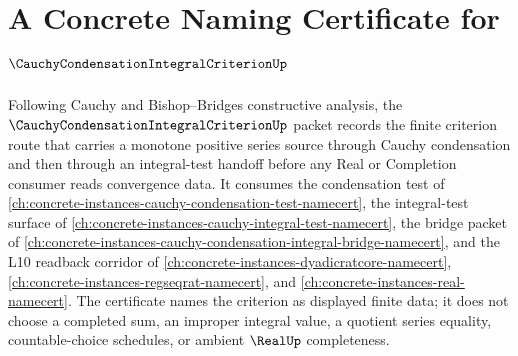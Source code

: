 \chapter{A Concrete Naming Certificate for $\CauchyCondensationIntegralCriterionUp$}
\label{ch:concrete-instances-cauchy-condensation-integral-criterion-namecert}

Following Cauchy and Bishop--Bridges constructive analysis, the $\CauchyCondensationIntegralCriterionUp$ packet records the finite criterion route that carries a monotone positive series source through Cauchy condensation and then through an integral-test handoff before any Real or Completion consumer reads convergence data. It consumes the condensation test of \autoref{ch:concrete-instances-cauchy-condensation-test-namecert}, the integral-test surface of \autoref{ch:concrete-instances-cauchy-integral-test-namecert}, the bridge packet of \autoref{ch:concrete-instances-cauchy-condensation-integral-bridge-namecert}, and the L10 readback corridor of \autoref{ch:concrete-instances-dyadicratcore-namecert}, \autoref{ch:concrete-instances-regseqrat-namecert}, and \autoref{ch:concrete-instances-real-namecert}. The certificate names the criterion as displayed finite data; it does not choose a completed sum, an improper integral value, a quotient series equality, countable-choice schedules, or ambient $\RealUp$ completeness.

